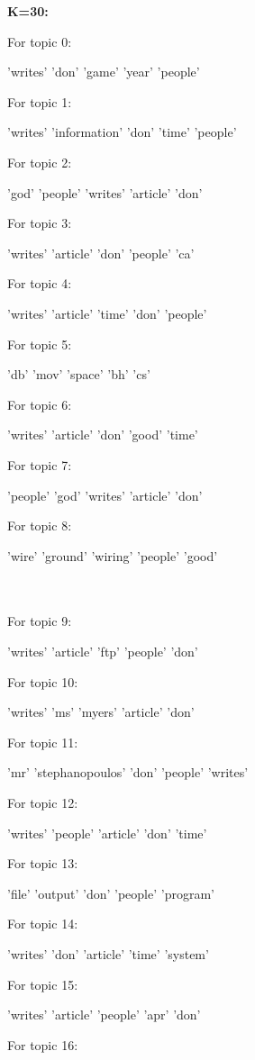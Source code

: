 \documentclass[12pt]{article}
\begin{document}
\par 
{\bf K=30:}
\par
\begin{multicols}{2}
For topic 0:
\par
'writes' 'don' 'game' 'year' 'people' \par
For topic 1:
\par
'writes' 'information' 'don' 'time' 'people' \par
For topic 2:
\par
'god' 'people' 'writes' 'article' 'don' \par
For topic 3:
\par
'writes' 'article' 'don' 'people' 'ca' \par
For topic 4:
\par
'writes' 'article' 'time' 'don' 'people' \par
For topic 5:
\par
'db' 'mov' 'space' 'bh' 'cs' \par
For topic 6:
\par
'writes' 'article' 'don' 'good' 'time' \par
For topic 7:
\par
'people' 'god' 'writes' 'article' 'don' \par
For topic 8:
\par
'wire' 'ground' 'wiring' 'people' 'good' \par
~\\
~\\
For topic 9:
\par
'writes' 'article' 'ftp' 'people' 'don' \par
For topic 10:
\par
'writes' 'ms' 'myers' 'article' 'don' \par
For topic 11:
\par
'mr' 'stephanopoulos' 'don' 'people' 'writes' \par
For topic 12:
\par
'writes' 'people' 'article' 'don' 'time' \par
For topic 13:
\par
'file' 'output' 'don' 'people' 'program' \par
For topic 14:
\par
'writes' 'don' 'article' 'time' 'system' \par
For topic 15:
\par
'writes' 'article' 'people' 'apr' 'don' \par
For topic 16:
\par

\end{multicols}
\end{document}
